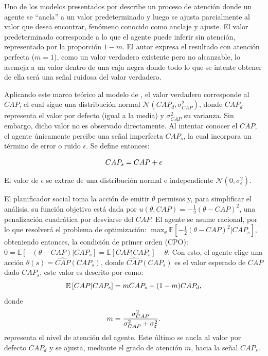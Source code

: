Uno de los modelos presentados por  describe un proceso de atención donde un agente se ``ancla'' a un valor predeterminado y luego se ajusta parcialmente al valor que desea encontrar, fenómeno conocido como anclaje y ajuste. El valor predeterminado corresponde a lo que el agente puede inferir sin atención, representado por la proporción $1-m$. El autor expresa el resultado con atención perfecta ($m=1$), como un valor verdadero existente pero no alcanzable, lo asemeja a un valor dentro de una caja negra donde todo lo que se intente obtener de ella será una señal ruidosa del valor verdadero. \medskip

Aplicando este marco teórico al modelo de , el valor verdadero corresponde al $CAP$, el cual sigue una distribución normal $\mathcal{N}(CAP_d,\sigma^2_{CAP})$, donde $CAP_d$ representa el valor por defecto (igual a la media) y $\sigma^2_{CAP}$ su varianza. Sin embargo, dicho valor no es observado directamente. Al intentar conocer el $CAP$, el agente únicamente percibe una señal imperfecta $CAP_s$, la cual incorpora un término de error o ruido $\epsilon$. Se define entonces:

\begin{equation}\label{eq:senal}
CAP_s = CAP + \epsilon
\end{equation}

El valor de $\epsilon$ se extrae de una distribución normal e independiente $\mathcal{N}(0, \sigma_\epsilon^2)$.

El planificador social toma la acción de emitir $\theta$ permisos y, para simplificar el análisis, su función objetivo está dada por $u(\theta,CAP)=-\frac{1}{2}(\theta-CAP)^2$, una penalización cuadrática por desviarse del $CAP$. El agente se asume racional, por lo que resolverá el problema de optimización:  $\max_{\theta} \mathbb{E}[-\frac{1}{2} (\theta-CAP)^2|CAP_s]$, obteniendo entonces, la condición de primer orden (CPO): $0=\mathbb{E}[- (\theta-CAP)|CAP_s]=\mathbb{E}[CAP|CAP_s]-\theta$. Con esto, el agente elige una acción $\theta(s)=\hat{CAP}(CAP_s)$, donde $\hat{CAP}(CAP_s)$ es el valor esperado de $CAP$ dado $CAP_s$, este valor es descrito por   como: 
\begin{equation}\label{eq:accion_optima}
\mathbb{E}\left[CAP|CAP_s\right] = m CAP_s + (1 - m)CAP_d,
\end{equation}
donde
\begin{equation} \label{eq:m}
m = \frac{\sigma_{CAP}^2}{\sigma_{CAP}^2 + \sigma_\varepsilon^2}.
\end{equation}
representa el nivel de atención del agente. Este último se ancla al valor por defecto $CAP_d$ y se ajusta, mediante el grado de atención $m$, hacia la señal $CAP_s$.

